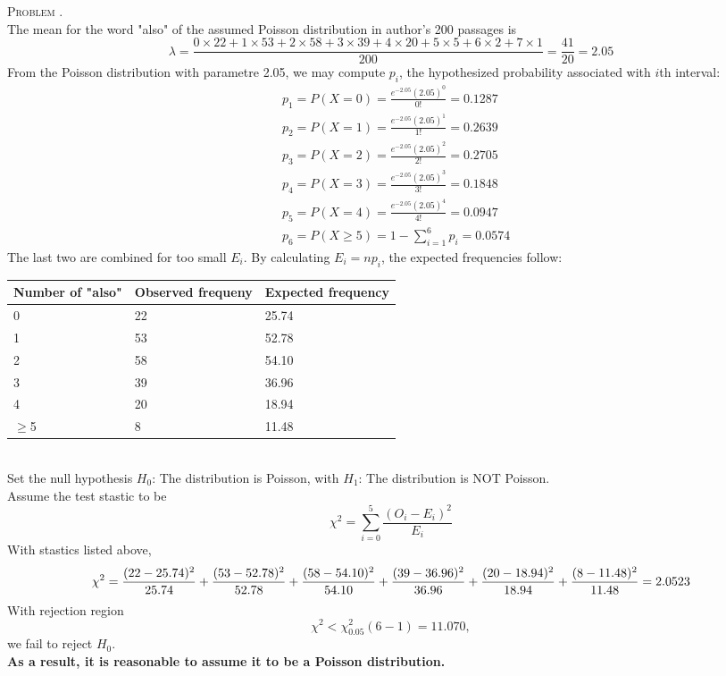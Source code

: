 \documentclass[12pt, a4paper, oneside]{article}
\newcounter{problemname}
\newenvironment{problem}{\stepcounter{problemname}\par\noindent\textsc{Problem \arabic{problemname}. }}{\\\par}
\begin{document}
\begin{problem}
    \\
    The mean for the word "also" of the assumed Poisson distribution in author's 200 passages is
    $$ \lambda = \frac{0\times22 + 1\times53 + 2\times58 + 3\times39 + 4\times20 + 5\times5 + 6\times2 + 7\times1}{200} 
               = \frac{41}{20} = 2.05 
    $$
    From the Poisson distribution with parametre 2.05, we may compute $p_i$, the hypothesized probability associated with $i$th interval:
    \begin{align*}
    &p_1 = P(X=0) =\frac{e^{-2.05}(2.05)^0}{0!} = 0.1287 \\
    &p_2 = P(X=1) =\frac{e^{-2.05}(2.05)^1}{1!} = 0.2639 \\
    &p_3 = P(X=2) =\frac{e^{-2.05}(2.05)^2}{2!} = 0.2705 \\
    &p_4 = P(X=3) =\frac{e^{-2.05}(2.05)^3}{3!} = 0.1848 \\
    &p_5 = P(X=4) =\frac{e^{-2.05}(2.05)^4}{4!} = 0.0947 \\
    &p_6 = P(X\geq5) = 1 - \sum_{i=1}^{6} p_i  =  0.0574 
    \end{align*}
    The last two are combined for too small $E_i$. By calculating $E_i = np_i$, the expected frequencies follow:
    \begin{table}[!h]
        \centering
        \begin{tabular}{|l|l|l|}
        \hline
            Number of "also"  & Observed frequeny & Expected frequency \\ \hline
            0 & 22 & 25.74  \\ \hline
            1 & 53 & 52.78  \\ \hline
            2 & 58 & 54.10  \\ \hline
            3 & 39 & 36.96  \\ \hline
            4 & 20 & 18.94  \\ \hline
       $\geq$5 & 8  & 11.48  \\ \hline
        \end{tabular}
    \end{table}
    \\
    Set the null hypothesis $H_0$: The distribution is Poisson, 
    with $H_1$: The distribution is NOT Poisson.\\
    Assume the test stastic to be 
        $$\chi^2 = \sum_{i=0}^{5} \frac{(O_i-E_i)^2}{E_i} $$
    With stastics listed above, 
    $$\chi^2 = \frac{(22-25.74)^2}{25.74}+\frac{(53-52.78)^2}{52.78}+\frac{(58-54.10)^2}{54.10}\\
                    +\frac{(39-36.96)^2}{36.96}+\frac{(20-18.94)^2}{18.94}+\frac{(8-11.48)^2}{11.48}=2.0523\\
    $$
    With rejection region $$ \chi^2 < \chi^2_{0.05}(6-1) = 11.070,$$
    we fail to reject $H_0$.\\
    \textbf{As a result, it is reasonable to assume it to be a Poisson distribution.}
\end{problem}
\end{document}
